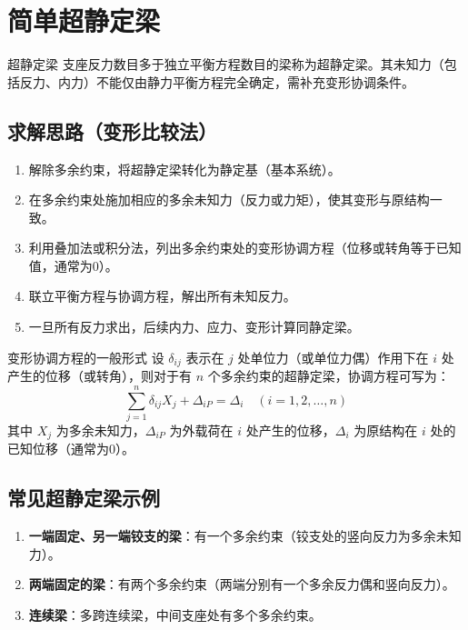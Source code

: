 \section{简单超静定梁}

\begin{mydefinition}{超静定梁}
    支座反力数目多于独立平衡方程数目的梁称为超静定梁。其未知力（包括反力、内力）不能仅由静力平衡方程完全确定，需补充变形协调条件。
\end{mydefinition}

\subsection{求解思路（变形比较法）}
\begin{enumerate}
    \item 解除多余约束，将超静定梁转化为静定基（基本系统）。
    \item 在多余约束处施加相应的多余未知力（反力或力矩），使其变形与原结构一致。
    \item 利用叠加法或积分法，列出多余约束处的变形协调方程（位移或转角等于已知值，通常为0）。
    \item 联立平衡方程与协调方程，解出所有未知反力。
    \item 一旦所有反力求出，后续内力、应力、变形计算同静定梁。
\end{enumerate}

\begin{myTheorem}{变形协调方程的一般形式}
    设 \( \delta_{ij} \) 表示在 \(j\) 处单位力（或单位力偶）作用下在 \(i\) 处产生的位移（或转角），则对于有 \(n\) 个多余约束的超静定梁，协调方程可写为：
    \[
    \sum_{j=1}^{n} \delta_{ij} X_j + \Delta_{iP} = \Delta_i \quad (i=1,2,\dots,n)
    \]
    其中 \(X_j\) 为多余未知力，\(\Delta_{iP}\) 为外载荷在 \(i\) 处产生的位移，\(\Delta_i\) 为原结构在 \(i\) 处的已知位移（通常为0）。
\end{myTheorem}

\subsection{常见超静定梁示例}
\begin{enumerate}
    \item \textbf{一端固定、另一端铰支的梁}：有一个多余约束（铰支处的竖向反力为多余未知力）。
    \item \textbf{两端固定的梁}：有两个多余约束（两端分别有一个多余反力偶和竖向反力）。
    \item \textbf{连续梁}：多跨连续梁，中间支座处有多个多余约束。
\end{enumerate}


